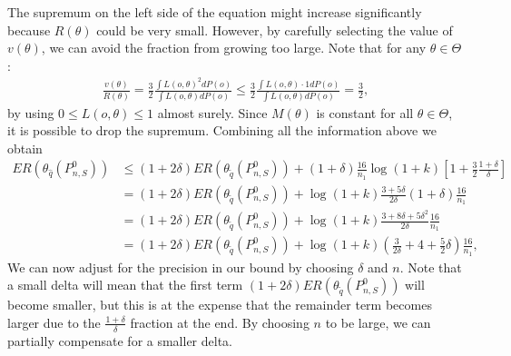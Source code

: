 \documentclass[11pt, a4paper]{article}
\theoremstyle{definition}
\theoremstyle{remark}
\newcommand{\cl}{q}
\begin{document}
The supremum on the left side of the equation might increase significantly because $R(\theta)$ could be very small. However, by carefully selecting the value of $v(\theta)$, we can avoid the fraction from growing too large. Note that for any $ \theta \in \Theta $:
\begin{align*}
    \frac{v(\theta)}{R(\theta)} = \frac{3}{2} \frac{\int L(o, \theta)^2 d P(o)}{\int L(o, \theta) dP(o)  } \leq \frac{3}{2} \frac{\int L(o, \theta) \cdot 1 dP(o) }{\int L(o, \theta) dP(o) } = \frac{3}{2},
\end{align*}
by using $ 0 \leq L(o, \theta) \leq 1 $ almost surely. Since $ M(\theta) $ is constant for all $ \theta \in \Theta $, it is possible to drop the supremum. Combining all the information above we obtain 
\begin{align*}
   ER(\theta_{\hat{\cl}}(P_{n, S}^{0})) &\leq(1 + 2 \delta) ER(\theta_{ \tilde{\cl}}(P_{n,S}^{0})) +(1 + \delta) \frac{16}{n_1} \log (1 +k) \left[ 1 + \frac{3}{2} \frac{1 + \delta}{\delta}\right]\\
                                        &= (1 + 2 \delta) ER(\theta_{ \tilde{\cl}}(P_{n,S}^{0})) +\log (1 +k) \frac{3 + 5\delta}{2\delta}(1 + \delta) \frac{16}{n_1} \\
                                        &= (1 + 2 \delta) ER(\theta_{ \tilde{\cl}}(P_{n,S}^{0})) +\log (1 +k) \frac{3 + 8\delta + 5 \delta^2}{2\delta}\frac{16}{n_1} \\\
                                        &= (1 + 2 \delta) ER(\theta_{ \tilde{\cl}}(P_{n,S}^{0})) +\log (1 +k) \left( \frac{3}{2\delta} + 4 + \frac{5}{2} \delta \right) \frac{16}{n_1},
\end{align*}
We can now adjust for the precision in our bound by choosing $ \delta $ and $ n $. Note that a small delta will mean that the first term $ (1 + 2 \delta) E R(\theta_{ \tilde{q} }(P_{n, S}^{0})) $ will become smaller, but this is at the expense that the remainder term becomes larger due to the $ \frac{1 + \delta}{ \delta} $ fraction at the end. By choosing $ n $ to be large, we can partially compensate for a smaller delta.
\end{document}
